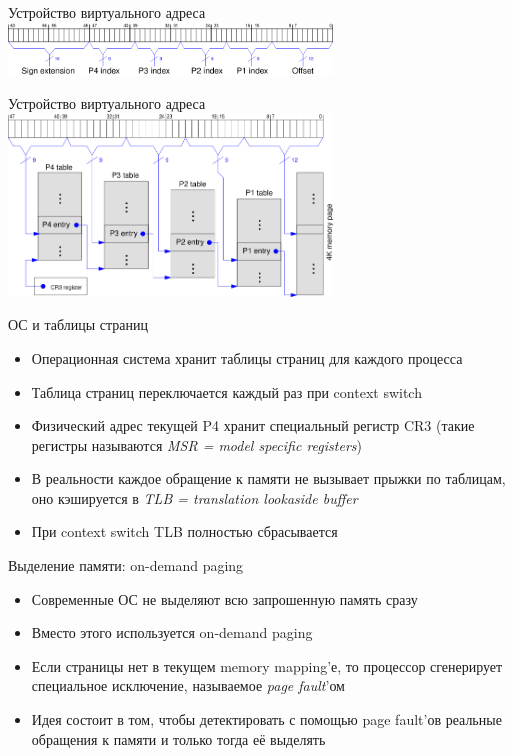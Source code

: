 \documentclass[10pt,pdf,hyperref={unicode}]{beamer}
\begin{document}
\begin{frame}{Устройство виртуального адреса}
\center\includegraphics[width=325px]{x86_address_structure.png}
\end{frame}

\begin{frame}{Устройство виртуального адреса}
\center\includegraphics[width=325px]{X86_Paging_64bit.png}
\end{frame}

\begin{frame}{ОС и таблицы страниц}
\begin{itemize}
    \item Операционная система хранит таблицы страниц для каждого процесса
    \item Таблица страниц переключается каждый раз при context switch
    \item Физический адрес текущей P4 хранит специальный регистр CR3 (такие регистры называются \emph{MSR = model specific registers})
    \item В реальности каждое обращение к памяти не вызывает прыжки по таблицам, оно кэшируется в \emph{TLB = translation lookaside buffer}
    \item При context switch TLB полностью сбрасывается
\end{itemize}
\end{frame}

\begin{frame}{Выделение памяти: on-demand paging}
\begin{itemize}
    \item Современные ОС не выделяют всю запрошенную память сразу
    \item Вместо этого используется on-demand paging
    \item Если страницы нет в текущем memory mapping'е, то процессор сгенерирует специальное исключение, называемое \emph{page fault}'ом
    \item Идея состоит в том, чтобы детектировать с помощью page fault'ов реальные обращения к памяти и только тогда её выделять
\end{itemize}
\end{frame}
\end{document}
